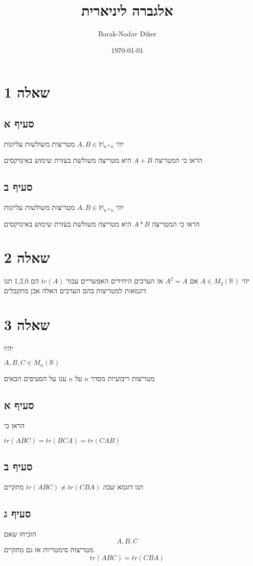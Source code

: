 \documentclass[11pt]{article}
\author{Barak-Nadav Diker}
\date{\today}
\title{אלגברה ליניארית}
\begin{document}
\maketitle
\tableofcontents

\section*{שאלה 1}
\label{sec:org6f1ba3b}
\subsection*{סעיף א}
\label{sec:org587440c}
יהי
\(A,B \in \mathbb{M} _{n*n}\)
מטריצות משולשות עליונות

הראו כי המטריצה
\(A+B\)
היא מטריצה משולשת
בעזרת שימוש באינדקסים
\subsection*{סעיף ב}
\label{sec:org0b6de0c}
יהי
\(A,B \in \mathbb{M} _{n*n}\)
מטריצות משולשות עליונות

הראו כי המטריצה
\(A*B\)
היא מטריצה משולשת
בעזרת שימוש באינדקסים
\section*{שאלה 2}
\label{sec:orga5a3662}
יהי
\(A\in M_{2} (\mathbb{R})\)
אם
\(A^2 = A\)
אז הערכים היחידים האפשריים עבור
\(tr(A)\)
הם
1,2,0
תנו דוגמאות למטריצות בהם הערכים האלה אכן מתקבלים
\section*{שאלה 3}
\label{sec:orge1eafbf}
יהיו

\(A,B,C \in M_n(\mathbb{R})\)

מטריצות ריבועיות מסדר
\(n\)
על
\(n\)
ענו על הסעיפים הבאים
\subsection*{סעיף א}
\label{sec:org661b40e}
הראו כי

\(tr(ABC) = tr(BCA) = tr(CAB)\)
\subsection*{סעיף ב}
\label{sec:org1f4f788}
תנו דוגמא שבה
\(tr(ABC) \neq tr(CBA)\)
מתקיים
\subsection*{סעיף ג}
\label{sec:orgcd28f55}
הוכיחו שאם
\[A,B,C\]
מטריצות סימטריות אז גם
מתקיים
\[ tr(ABC) = tr(CBA) \]
\end{document}
